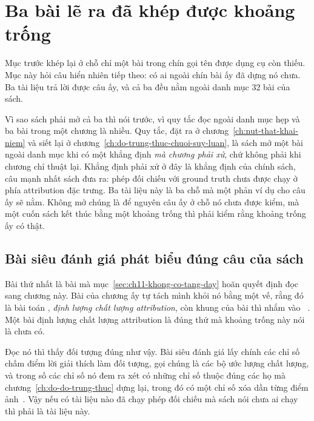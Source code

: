 \section{Ba bài lẽ ra đã khép được khoảng trống}
\label{sec:ch18-ba-bai-le-ra-da-dong}

%
Mục trước khép lại ở chỗ chỉ một bài trong chín gọi tên được dụng cụ còn thiếu.
Mục này hỏi câu hiển nhiên tiếp theo: có ai ngoài chín bài ấy đã dựng nó chưa.
Ba tài liệu trả lời được câu ấy, và cả ba đều nằm ngoài danh mục 32 bài của sách.

%
Vì sao sách phải mở cả ba thì nói trước, vì quy tắc đọc ngoài danh mục hẹp và ba
bài trong một chương là nhiều. Quy tắc, đặt ra ở
chương~\ref{ch:nut-that-khai-niem} và siết lại ở
chương~\ref{ch:do-trung-thuc-chuoi-suy-luan}, là sách mở một bài ngoài danh mục
khi có một khẳng định \emph{mà chương phải xử}, chứ không phải khi chương chỉ
thuật lại. Khẳng định phải xử ở đây là khẳng định của chính sách, câu mạnh nhất
sách đưa ra: phép đối chiếu với ground truth chưa được chạy ở phía attribution
đặc trưng. Ba tài liệu này là ba chỗ mà một phản ví dụ cho câu ấy sẽ nằm. Không
mở chúng là để nguyên câu ấy ở chỗ nó chưa được kiểm, mà một cuốn sách kết thúc
bằng một khoảng trống thì phải kiểm rằng khoảng trống ấy có thật.

\subsection*{Bài siêu đánh giá phát biểu đúng câu của sách}

%
Bài thứ nhất là bài mà mục~\ref{sec:ch11-khong-co-tang-day} hoãn quyết định đọc
sang chương này. Bài của chương ấy tự tách mình khỏi nó bằng một vế, rằng đó là
bài toán , \emph{định lượng chất lượng
attribution}, còn khung của bài thì nhắm vào
~\autocite{p23metagame}. Một bài định lượng chất lượng attribution là đúng thứ
mà khoảng trống này nói là chưa có.

Đọc nó thì thấy đối tượng đúng như vậy. Bài siêu đánh giá lấy chính các chỉ số
chấm điểm lời giải thích làm đối tượng, gọi chúng là các bộ ước lượng chất lượng,
và trong số các chỉ số nó đem ra xét có những chỉ số thuộc đúng các họ mà
chương~\ref{ch:do-do-trung-thuc} dựng lại, trong đó có một chỉ số xóa dần từng
điểm ảnh~\autocite{mmetaquantus}. Vậy nếu có tài liệu nào đã chạy phép đối chiếu
mà sách nói chưa ai chạy thì phải là tài liệu này.

